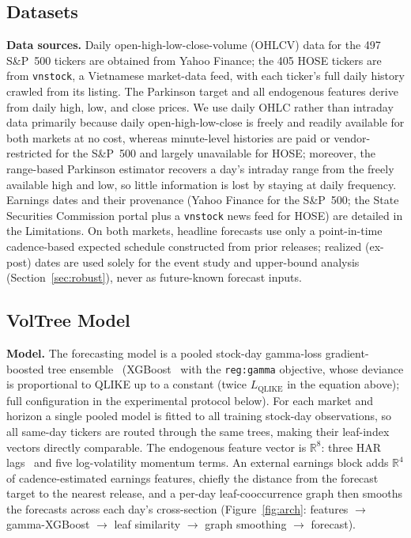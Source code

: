 \documentclass[runningheads,a4paper]{llncs}
\begin{document}
\subsection{Datasets}
\textbf{Data sources.} Daily open-high-low-close-volume (OHLCV) data for the 497 S\&P~500 tickers are obtained from Yahoo Finance; the 405 HOSE
tickers are from \texttt{vnstock}, a Vietnamese market-data feed, with each ticker's full daily history
crawled from its listing. The Parkinson target and all endogenous features derive from daily high, low,
and close prices. We use daily OHLC rather than intraday data primarily because daily
open-high-low-close is freely and readily available for both markets at no cost, whereas minute-level
histories are paid or vendor-restricted for the S\&P~500 and largely unavailable for HOSE; moreover, the
range-based Parkinson estimator recovers a day's intraday range from the freely available high and low, so
little information is lost by staying at daily frequency. Earnings dates and their
provenance (Yahoo Finance for the S\&P~500; the State
Securities Commission portal plus a \texttt{vnstock} news feed for HOSE) are detailed in the Limitations.
On both markets, headline forecasts use only a point-in-time cadence-based expected schedule constructed
from prior releases; realized (ex-post) dates are used solely for the event study and upper-bound analysis
(Section~\ref{sec:robust}), never as future-known forecast inputs.

\subsection{VolTree Model}\label{sec:voltree}
\textbf{Model.} The forecasting model is a pooled stock-day gamma-loss gradient-boosted tree
ensemble~\cite{friedman2001} (XGBoost~\cite{chen2016} with the \texttt{reg:gamma} objective, whose
deviance is proportional to QLIKE up to a constant (twice $L_{\mathrm{QLIKE}}$ in the equation above); full configuration in the experimental protocol
below). For each market and horizon a single pooled model is fitted to all training stock-day
observations, so all same-day tickers are routed through the same trees, making their leaf-index vectors
directly comparable. The endogenous feature vector is $\mathbb{R}^8$: three HAR lags~\cite{corsi2009} and
five log-volatility momentum terms. An external earnings block adds $\mathbb{R}^4$ of cadence-estimated
earnings features, chiefly the distance from the forecast target to the nearest release, and a
per-day leaf-cooccurrence graph then smooths the forecasts across each day's cross-section
(Figure~\ref{fig:arch}: features $\rightarrow$ gamma-XGBoost $\rightarrow$ leaf similarity $\rightarrow$
graph smoothing $\rightarrow$ forecast).
\end{document}
